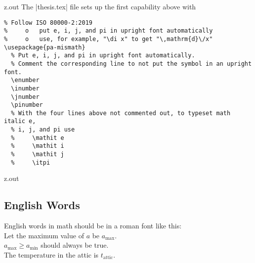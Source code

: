 \MyIO


\begin{VerbatimOut}{z.out}
\newpage
The |thesis.tex| file sets up the first capability above with
\begin{verbatim}
% Follow ISO 80000-2:2019
%     o   put e, i, j, and pi in upright font automatically
%     o   use, for example, "\di x" to get "\,mathrm{d}\/x"
\usepackage{pa-mismath}
  % Put e, i, j, and pi in upright font automatically.
  % Comment the corresponding line to not put the symbol in an upright font.
  \enumber
  \inumber
  \jnumber
  \pinumber
  % With the four lines above not commented out, to typeset math italic e,
  % i, j, and pi use
  %     \mathit e
  %     \mathit i
  %     \mathit j
  %     \itpi
\end{verbatim}
\end{VerbatimOut}

\MyIO


\begin{VerbatimOut}{z.out}
\subsection{English Words}

English words in math should be in a roman font like this:\\
Let the maximum value of \(a\) be \(a_\text{max}\).\\
\(a_\text{max} \ge a_\text{min}\) should always be true.\\
The temperature in the attic is \(t_\text{attic}\).
\end{VerbatimOut}

\MyIO


